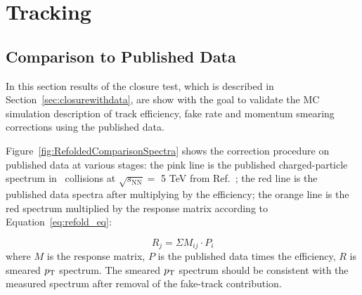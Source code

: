 



\section{Tracking}
\subsection{Comparison to Published Data}
\label{sec:tracking_published_comparision}
In this section results of the closure test, which is described in Section~\ref{sec:closurewithdata}, are show with the goal to validate the MC simulation description of track efficiency, fake rate and momentum smearing corrections using the published data. 

Figure~\ref{fig:RefoldedComparisonSpectra} shows the correction procedure on published data at various stages: the pink line is the published charged-particle spectrum in \pPb~collisions at {$\sqrt{s_{\mathrm{NN}}}=$ 5 TeV} from Ref.~\cite{Acharya:2018qsh}; the red line is the published data spectra after multiplying by the efficiency; the orange line is the red spectrum multiplied by the response matrix according to Equation~\ref{eq:refold_eq}:

\begin{equation}\label{eq:refold_eq}
R_{j} = \Sigma M_{ij} \cdot P_{i}
\end{equation}
where $M$ is the response matrix, $P$ is the published data times the efficiency, $R$ is smeared $p_{\mathrm{T}}$ spectrum. The smeared $p_{\mathrm{T}}$ spectrum should be consistent with the measured spectrum after removal of the fake-track contribution.

